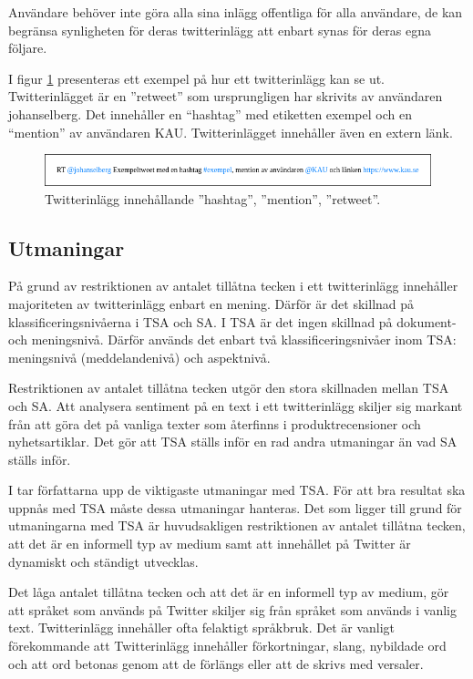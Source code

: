 \documentclass{kaumasters} %
\begin{document}
Användare behöver inte göra alla sina inlägg offentliga för alla användare, de kan begränsa synligheten för deras twitterinlägg att enbart synas för deras egna följare. 

I figur \ref{fig:tweet} presenteras ett exempel på hur ett twitterinlägg kan se ut. Twitterinlägget är en ''retweet'' som ursprungligen har skrivits av användaren johanselberg. Det innehåller en “hashtag” med etiketten exempel och en “mention” av användaren KAU. Twitterinlägget innehåller även en extern länk.

\begin{figure}[h]
\includegraphics[width=12cm]{exempeltweet}
\centering
\caption{Twitterinlägg innehållande ''hashtag'', ''mention'', ''retweet''.}
\label{fig:tweet}
\end{figure}

\subsection{Utmaningar} \label{TSAchall}
På grund av restriktionen av antalet tillåtna tecken i ett twitterinlägg innehåller majoriteten av twitterinlägg enbart en mening. Därför är det skillnad på klassificeringsnivåerna i TSA och SA. I TSA är det ingen skillnad på dokument- och meningsnivå. Därför används det enbart två klassificeringsnivåer inom TSA: meningsnivå (meddelandenivå) och aspektnivå. \cite{TSAsurvey}

Restriktionen av antalet tillåtna tecken utgör den stora skillnaden mellan TSA och SA. Att analysera sentiment på en text i ett twitterinlägg skiljer sig markant från att göra det på vanliga texter som återfinns i produktrecensioner och nyhetsartiklar. Det gör att TSA ställs inför en rad andra utmaningar än vad SA ställs inför.

I \cite{TSAsurvey} tar författarna upp de viktigaste utmaningar med TSA. För att bra resultat ska uppnås med TSA måste dessa utmaningar hanteras. Det som ligger till grund för utmaningarna med TSA är huvudsakligen restriktionen av antalet tillåtna tecken, att det är en informell typ av medium samt att innehållet på Twitter är dynamiskt och ständigt utvecklas.

Det låga antalet tillåtna tecken och att det är en informell typ av medium, gör att språket som används på Twitter skiljer sig från språket som används i vanlig text. Twitterinlägg innehåller ofta felaktigt språkbruk. Det är vanligt förekommande att Twitterinlägg innehåller förkortningar, slang, nybildade ord och att ord betonas genom att de förlängs eller att de skrivs med versaler. 
\end{document}
